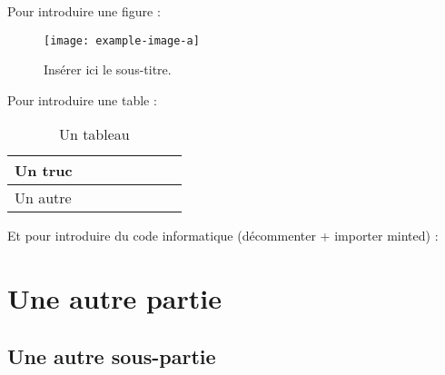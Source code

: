 \documentclass[a4paper,12pt,french]{article}
\begin{document}
Pour introduire une figure : 

\begin{figure}[ht!]
    \centering
    \texttt{[image: example-image-a]}
    \caption{Insérer ici le sous-titre.}
    \label{fig:}
\end{figure}




Pour introduire une table : 

\begin{table}[ht!]
	\begin{center}
		\begin{tabular}{@{}llllllll@{}}
			\toprule
			Un truc &  &  &  &  &  &  &  \\ \midrule
			Un autre &  &  &  &  &  &  & \\ \bottomrule
		\end{tabular}
		\caption{Un tableau \label{tab:id-de-la-table}}
		\label{tab:}
	\end{center}
\end{table}



Et pour introduire du code informatique (décommenter + importer minted) :

%



\section{Une autre partie}
\subsection{Une autre sous-partie}
\lipsum[2]



\end{document}
